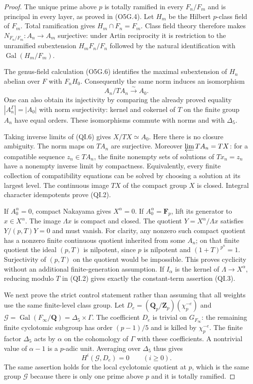 \documentclass[11pt,a4paper]{article}
\theoremstyle{definition}
\begin{document}
\begin{proof}
The unique prime above $p$ is totally ramified in every
$F_n/F_m$ and is principal in every layer, as proved in (O5G.4).
Let $H_m$ be the Hilbert $p$-class field of $F_m$.
Total ramification gives $H_m\cap F_n=F_m$.  Class field theory
therefore makes $N_{F_n/F_m}:A_n\to A_m$ surjective: under
Artin reciprocity it is restriction to the unramified subextension
$H_mF_n/F_n$ followed by the natural identification with
$\operatorname{Gal}(H_m/F_m)$.

The genus-field calculation (O5G.6) identifies the maximal
subextension of $H_n$ abelian over $F$ with $F_nH_0$.
Consequently the same norm induces an isomorphism
\[
                 A_n/TA_n\xrightarrow{\ \sim\ }A_0.
 \tag{QI.6}
\]
One can also obtain its injectivity by comparing the already
proved equality $|A_n^{\Gamma}|=|A_0|$ with norm surjectivity:
kernel and cokernel of $T$ on the finite group $A_n$ have equal
orders.  These isomorphisms commute with norms and with $\Delta_5$.

Taking inverse limits of (QI.6) gives $X/TX\simeq A_0$.
Here there is no closure ambiguity.  The norm maps on $TA_n$
are surjective.  Moreover $\varprojlim TA_n=TX$: for a compatible
sequence $z_n\in TA_n$, the finite nonempty sets of solutions
of $Tx_n=z_n$ have a nonempty inverse limit by compactness.
Equivalently, every finite collection of compatibility equations
can be solved by choosing a solution at its largest level.
The continuous image $TX$ of the compact group $X$ is closed.
Integral character idempotents prove (QI.2).

If $A_0^\alpha=0$, compact Nakayama gives $X^\alpha=0$.
If $A_0^\alpha=\mathbf F_p$, lift its generator to $x\in X^\alpha$.
The image $\Lambda x$ is compact and closed.  The quotient
$Y=X^\alpha/\Lambda x$ satisfies $Y/(p,T)Y=0$ and must vanish.
For clarity, any nonzero such compact quotient has a nonzero
finite continuous quotient inherited from some $A_n$; on that
finite quotient the ideal $(p,T)$ is nilpotent, since $p$ is
nilpotent and $(1+T)^{p^n}=1$.  Surjectivity of $(p,T)$ on
the quotient would be impossible.  This proves cyclicity without
an additional finite-generation assumption.  If $I_\alpha$ is
the kernel of $\Lambda\to X^\alpha$, reducing modulo $T$ in
(QI.2) gives exactly the constant-term assertion (QI.3).

We next prove the strict control statement rather than assuming
that all weights use the same finite-level class group.
Let $D_e=(\mathbf Q_p/\mathbf Z_p)(\chi_p^{-e})$ and
$\mathcal G=\operatorname{Gal}(F_\infty/\mathbf Q)
 =\Delta_5\times\Gamma$.  The coefficient $D_e$ is trivial on
$G_{F_\infty}$: the remaining finite cyclotomic subgroup has
order $(p-1)/5$ and is killed by $\chi_p^{-e}$.
The finite factor $\Delta_5$ acts by $\alpha$ on the cohomology
of $\Gamma$ with these coefficients.  A nontrivial value of
$\alpha-1$ is a $p$-adic unit.  Averaging over $\Delta_5$ thus
gives
\[
                  H^i(\mathcal G,D_e)=0\qquad(i\ge0).
 \tag{QI.7}
\]
The same assertion holds for the local cyclotomic quotient at
$p$, which is the same group $\mathcal G$ because there is only
one prime above $p$ and it is totally ramified.


\end{proof}
\end{document}

